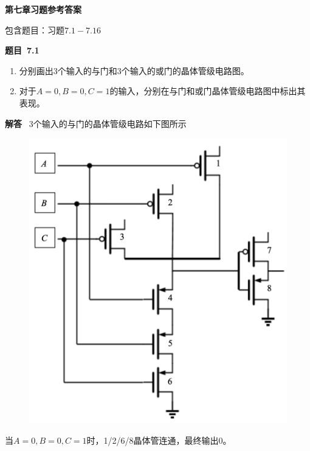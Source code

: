 \documentclass[10pt,a4paper,UTF8]{ctexart}
\newcommand{\problemname}{待定义}
\newenvironment{problem}{\begin{shaded}\par\noindent\textbf{题目\  \problemname}}{\end{shaded}\par}
\newenvironment{solution}{\par\noindent\textbf{解答}\ }{\par}
\begin{document}
\begin{center}
\LARGE\textbf{第七章习题参考答案}
\end{center}

{\kaishu 包含题目：习题$7.1-7.16$}

\renewcommand{\problemname}{7.1}
\begin{problem}
	\begin{enumerate}[(1)]
		\item 分别画出3个输入的与门和3个输入的或门的晶体管级电路图。
		\item 对于$A=0,B=0,C=1$的输入，分别在与门和或门晶体管级电路图中标出其表现。
	\end{enumerate}
\end{problem}

\begin{solution}
	3个输入的与门的晶体管级电路如下图所示
	\begin{figure}[H]
		\centering
		\includegraphics[scale=0.25]{img/7.1a.png}
	\end{figure}
	当$A=0,B=0,C=1$时，1/2/6/8晶体管连通，最终输出0。



\end{solution}
\end{document}
